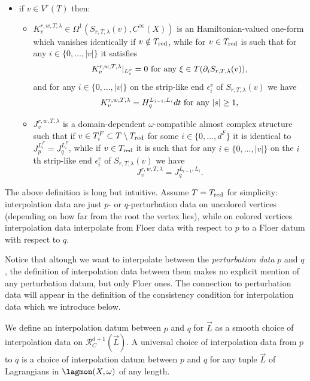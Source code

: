 \begin{dfn}
\begin{itemize}
\begin{itemize}
				\item $J^{r,w,T,\lambda}_v$ is a domain-dependent $\omega$-compatible almost complex structure such that if $v\in T_i^F\subset T\setminus T_\textnormal{red}$ for some $i\in\{0,\ldots, d^F\}$ it is identical to $J^{L_i^F}_p=J^{L_i^F}_q$, while if $v\in T_\textnormal{red}$ it is such that for any $i\in\{1,\ldots, |v|\}$ on the $i$th strip-like end $\epsilon_i^v$ of $S_{r,T,\lambda}(v)$ we have $$J^{r,w,T,\lambda}=J^{L_i, L_{i+1}}_p,$$ while on the $0$th strip-like end we have $$J^{r,w,T,\lambda}_v=J^{L_0,L_d}_q;$$
			\end{itemize}
			\item if $v\in V^r(T)$ then:
			\begin{itemize}
				\item $K^{r,w,T,\lambda}_v\in \Omega^1(S_{r,T,\lambda}(v),C^\infty(X))$ is an Hamiltonian-valued one-form which vanishes identically if $v\notin T_\textnormal{red}$, while for $v\in T_\textnormal{red}$ is such that for any $i\in\{0,\ldots, |v|\}$ it satisfies $$K^{r,w,T,\lambda}_v|_{L^v_i} = 0 \textnormal{   for any   }\xi\in T(\partial_iS_{r,T,\lambda}(v)),$$ and for any $i\in\{0,\ldots, |v|\}$ on the strip-like end $\epsilon^v_i$ of $S_{r,T,\lambda}(v)$ we have $$K^{r,w,T,\lambda}_v=H^{L_{i-1},L_{i}}_qdt \textnormal{   for any   }|s|\geq 1,$$
				\item $J^{r,w,T,\lambda}_v$ is a domain-dependent $\omega$-compatible almost complex structure such that if $v\in T_i^F\subset T\setminus T_\textnormal{red}$ for some $i\in\{0,\ldots, d^F\}$ it is identical to $J^{L_i^F}_p=J^{L_i^F}_q$, while if $v\in T_\textnormal{red}$ it is such that for any $i\in\{0,\ldots, |v|\}$ on the $i$th strip-like end $\epsilon_i^v$ of $S_{r,T,\lambda}(v)$ we have $$J^{r,w,T,\lambda}_v=J^{L_{i-1},L_{i}}_q.$$
			\end{itemize}
		\end{itemize}
	\end{dfn}
	\begin{rem}
		The above definition is long but intuitive. Assume $T=T_\textnormal{red}$ for simplicity: interpolation data are just $p$- or $q$-perturbation data on uncolored vertices (depending on how far from the root the vertex lies), while on colored vertices interpolation data interpolate from Floer data with respect to $p$ to a Floer datum with respect to $q$.
	\end{rem}
	\begin{rem}
		Notice that altough we want to interpolate between the \textit{perturbation data} $p$ and $q$, the definition of interpolation data between them makes no explicit mention of any perturbation datum, but only Floer ones. The connection to perturbation data will appear in the definition of the consistency condition for interpolation data which we introduce below.
	\end{rem}
	We define an interpolation datum between $p$ and $q$ for $\vec{L}$ as a smooth choice of interpolation data on $\mathcal{R}^{d+1}_C(\vec{L})$. A universal choice of interpolation data from $p$ to $q$ is a choice of interpolation datum between $p$ and $q$ for any tuple $\vec{L}$ of Lagrangians in $\lagmon(X,\omega)$ of any length.\\
	
